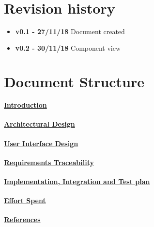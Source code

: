 \section{Revision history}
\begin{itemize}
\item \textbf{v0.1 - 27/11/18} Document created
\item \textbf{v0.2 - 30/11/18} Component view
\end{itemize}
\section{Document Structure}
\paragraph{\hyperref[sect:introduction]{Introduction}}
\paragraph{\hyperref[sect:architecturalDesign]{Architectural Design}} 
\paragraph{\hyperref[sect:userInterfaceDesign]{User	 Interface Design}}
\paragraph{\hyperref[sect:requirementsTraceability]{Requirements Traceability}}
\paragraph{\hyperref[sect:implementationIntegrationTestplan]{Implementation, Integration and Test plan}}
\paragraph{\hyperref[sect:effort]{Effort Spent}}
\paragraph{\hyperref[sect:references]{References}} 



